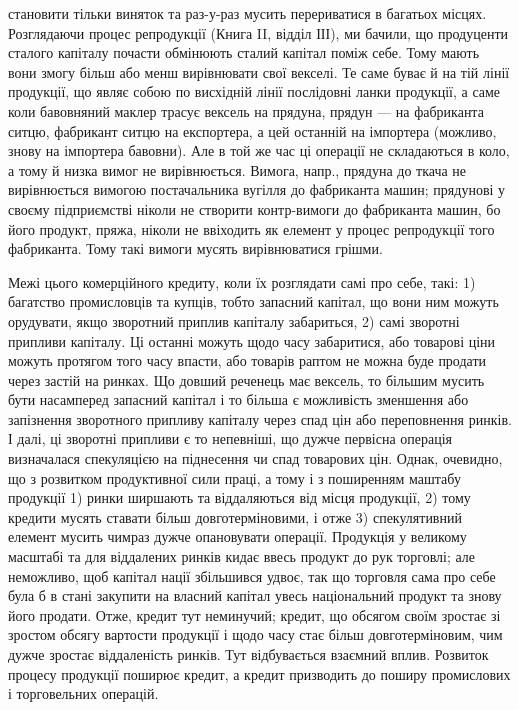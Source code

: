 \parcont{}  %
становити тільки виняток та раз-у-раз мусить перериватися в багатьох
місцях. Розглядаючи процес репродукції (Книга II, відділ ІІІ), ми бачили,
що продуценти сталого капіталу почасти обмінюють сталий капітал поміж
себе. Тому мають вони змогу більш або менш вирівнювати свої векселі. Те саме
буває й на тій лінії продукції, що являє собою по висхідній лінії послідовні ланки
продукції, а саме коли бавовняний маклер трасує вексель на прядуна, прядун —
на фабриканта ситцю, фабрикант ситцю на експортера, а цей останній на імпортера
(можливо, знову на імпортера бавовни). Але в той же час ці операції не складаються
в коло, а тому й низка вимог не вирівнюється. Вимога, напр., прядуна
до ткача не вирівнюється вимогою постачальника вугілля до фабриканта машин;
прядунові у своєму підприємстві ніколи не створити контр-вимоги до фабриканта
машин, бо його продукт, пряжа, ніколи не ввіходить як елемент у процес репродукції
того фабриканта. Тому такі вимоги мусять вирівнюватися грішми.

Межі цього комерційного кредиту, коли їх розглядати самі про себе,
такі: 1) багатство промисловців та купців, тобто запасний капітал, що вони ним
можуть орудувати, якщо зворотний приплив капіталу забариться, 2) самі зворотні
припливи капіталу. Ці останні можуть щодо часу забаритися, або товарові ціни
можуть протягом того часу впасти, або товарів раптом не можна буде продати
через застій на ринках. Що довший реченець має вексель, то більшим мусить
бути насамперед запасний капітал і то більша є можливість зменшення або
запізнення зворотного припливу капіталу через спад цін або переповнення ринків.
І далі, ці зворотні припливи є то непевніші, що дужче первісна операція визначалася
спекуляцією на піднесення чи спад товарових цін. Однак, очевидно, що
з розвитком продуктивної сили праці, а тому і з поширенням маштабу продукції
1) ринки ширшають та віддаляються від місця продукції, 2) тому кредити мусять
ставати більш довготерміновими, і отже 3) спекулятивний елемент мусить чимраз
дужче опановувати операції. Продукція у великому масштабі та для віддалених ринків
кидає ввесь продукт до рук торговлі; але неможливо, щоб капітал нації збільшився
удвоє, так що торговля сама про себе була б в стані закупити на власний
капітал увесь національний продукт та знову його продати. Отже, кредит
тут неминучий; кредит, що обсягом своїм зростає зі зростом обсягу вартости
продукції і щодо часу стає більш довготерміновим, чим дужче зростає віддаленість
ринків. Тут відбувається взаємний вплив. Розвиток процесу продукції
поширює кредит, а кредит призводить до поширу промислових і торговельних
операцій.

